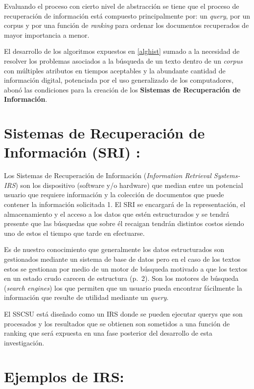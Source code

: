 \documentclass[
  10,
  openany]{book}
\begin{document}
Evaluando el proceso con cierto nivel de abstracción se tiene que el proceso de recuperación de información está compuesto principalmente por: un \emph{query}, por un corpus y por una función de \emph{ranking} para ordenar los documentos recuperados de mayor importancia a menor.

El desarrollo de los algoritmos expuestos en \ref{alghist} sumado a la necesidad de resolver los problemas asociados a la búsqueda de un texto dentro de un \emph{corpus} con múltiples atributos en tiempos aceptables y la abundante cantidad de información digital, potenciada por el uso generalizado de los computadores, abonó las condiciones para la creación de los \textbf{Sistemas de Recuperación de Información}.

\hypertarget{SRI}{%
\section{Sistemas de Recuperación de Información (SRI) :}\label{SRI}}

Los Sistemas de Recuperación de Información (\emph{Information Retrieval Systems-IRS}) son los dispositivo (software y/o hardware) que median entre un potencial usuario que requiere información y la colección de documentos que puede contener la información solicitada \citep{kraft2017} 1. El SRI se encargará de la representación, el almacenamiento y el acceso a los datos que estén estructurados y se tendrá presente que las búsquedas que sobre él recaigan tendrán distintos costos siendo uno de estos el tiempo que tarde en efectuarse.

Es de nuestro conocimiento que generalmente los datos estructurados son gestionados mediante un sistema de base de datos pero en el caso de los textos estos se gestionan por medio de un motor de búsqueda motivado a que los textos en un estado crudo carecen de estructura \citep{miningt2012} (p.~2). Son los motores de búsqueda (\emph{search engines}) los que permiten que un usuario pueda encontrar fácilmente la información que resulte de utilidad mediante un \emph{query}.

El SSCSU está diseñado como un IRS donde se pueden ejecutar querys que son procesados y los resultados que se obtienen son sometidos a una función de ranking que será expuesta en una fase posterior del desarrollo de esta investigación.

\hypertarget{ejemplos-de-irs}{%
\section{Ejemplos de IRS:}\label{ejemplos-de-irs}}
\end{document}

